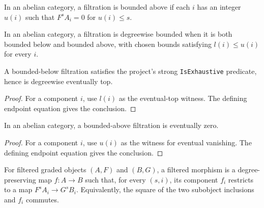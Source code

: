 \begin{definition}
  \leanok
  \label{def:core-bounded-above-filtration}
  In an abelian category, a filtration is bounded above if each $i$ has an
  integer $u(i)$ such that $F^sA_i=0$ for $u(i)\le s$.
\end{definition}

\begin{definition}
  \leanok
  \label{def:core-bounded-filtration}
  In an abelian category, a filtration is degreewise bounded when it is both
  bounded below and bounded above, with chosen bounds satisfying
  $l(i)\le u(i)$ for every $i$.
\end{definition}

\begin{lemma}
  \leanok
  \label{lem:core-bounded-below-exhaustive}
  A bounded-below filtration satisfies the project's strong
  \texttt{IsExhaustive} predicate, hence is degreewise eventually top.
\end{lemma}

\begin{proof}
  \leanok
  For a component $i$, use $l(i)$ as the eventual-top witness.  The
  defining endpoint equation gives the conclusion.
\end{proof}

\begin{lemma}
  \leanok
  \label{lem:core-bounded-above-eventually-zero}
  In an abelian category, a bounded-above filtration is eventually zero.
\end{lemma}

\begin{proof}
  \leanok
  For a component $i$, use $u(i)$ as the witness for eventual vanishing.  The
  defining endpoint equation gives the conclusion.
\end{proof}

\begin{definition}
  \leanok
  \label{def:core-filtered-morphism}
  For filtered graded objects $(A,F)$ and $(B,G)$, a filtered morphism is a
  degree-preserving map $f:A\to B$ such that, for every $(s,i)$, its component
  $f_i$ restricts to a map $F^sA_i\to G^sB_i$.  Equivalently, the square of
  the two subobject inclusions and $f_i$ commutes.
\end{definition}

